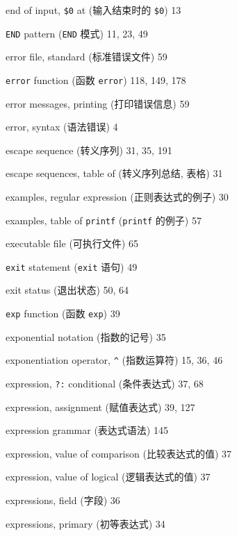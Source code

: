 \begin{multicols}{2}
\hangindent=2pc  end of input, \verb'$0' at (输入结束时的
\verb'$0') 13

\hangindent=2pc  \verb'END' pattern (\verb'END' 模式) 11, 23, 49

\hangindent=2pc  error file, standard (标准错误文件) 59

\hangindent=2pc  \verb'error' function (函数 \verb'error')
118, 149, 178

\hangindent=2pc  error messages, printing (打印错误信息) 59

\hangindent=2pc  error, syntax (语法错误) 4

\hangindent=2pc  escape sequence (转义序列) 31, 35, 191

\hangindent=2pc  escape sequences, table of (转义序列总结,
表格) 31

\hangindent=2pc  examples, regular expression (正则表达式的例子) 30

\hangindent=2pc  examples, table of \verb'printf'
(\verb'printf' 的例子) 57

\hangindent=2pc  executable file (可执行文件) 65

\hangindent=2pc  \verb'exit' statement (\verb'exit' 语句) 49

\hangindent=2pc  exit status (退出状态) 50, 64

\hangindent=2pc  \verb'exp' function (函数 \verb'exp') 39

\hangindent=2pc  exponential notation (指数的记号) 35

\hangindent=2pc  exponentiation operator, \verb'^' (指数运算符)
15, 36, 46

\hangindent=2pc  expression, \verb'?:' conditional (条件表达式)
37, 68

\hangindent=2pc  expression, assignment (赋值表达式) 39, 127

\hangindent=2pc  expression grammar (表达式语法) 145

\hangindent=2pc  expression, value of comparison (比较表达式的值) 37

\hangindent=2pc  expression, value of logical (逻辑表达式的值) 37

\hangindent=2pc  expressions, field (字段) 36

\hangindent=2pc  expressions, primary (初等表达式) 34


\end{multicols}
